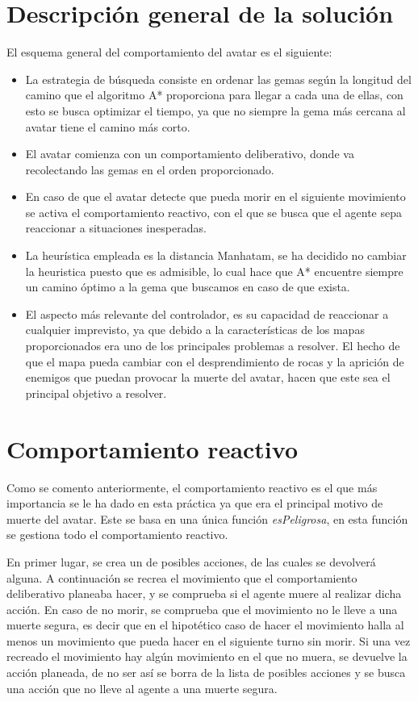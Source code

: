 \documentclass[size=a4, parskip=half, titlepage=false, toc=flat, toc=bib, 12pt]{scrartcl}
\begin{document}
\section{Descripción general de la solución}
El esquema general del comportamiento del avatar es el siguiente:
\begin{itemize}
\item La estrategia de búsqueda consiste en ordenar las gemas según la longitud del camino que el algoritmo A*
proporciona para llegar a cada una de ellas, con esto se busca optimizar el
tiempo, ya que no siempre la gema más cercana al avatar tiene el camino más corto.

\item El avatar comienza con un comportamiento deliberativo, donde va recolectando
las gemas en el orden proporcionado.

\item En caso de que el avatar detecte que pueda morir en el siguiente movimiento
se activa el comportamiento reactivo, con el que se busca que el agente
sepa reaccionar a situaciones inesperadas.

\item La heurística empleada es la distancia Manhatam, se ha decidido no cambiar
la heuristica puesto que es admisible, lo cual hace que A*
 encuentre siempre un camino óptimo a la gema que buscamos en caso de que exista.

\item El aspecto más relevante del controlador, es su capacidad de reaccionar
a cualquier imprevisto, ya que debido a la características de los mapas
proporcionados era uno de los principales problemas a resolver. El hecho de que
el mapa pueda cambiar con el desprendimiento de rocas y la aprición de enemigos
que puedan provocar la muerte del avatar, hacen que este sea el principal objetivo
a resolver.
\end{itemize}

\newpage

\section{Comportamiento reactivo}
Como se comento anteriormente, el comportamiento reactivo es el que más importancia
se le ha dado en esta práctica ya que era el principal motivo de muerte del avatar.
Este se basa en una única función \textit{esPeligrosa}, en esta función se gestiona
todo el comportamiento reactivo.

En primer lugar, se crea un  de posibles acciones, de las cuales
se devolverá alguna. A continuación se recrea el movimiento que el comportamiento
deliberativo planeaba hacer, y se comprueba si el agente muere al realizar dicha acción.
En caso de no morir, se comprueba que el movimiento no le lleve a una muerte segura,
es decir que en el hipotético caso de hacer el movimiento halla al menos un movimiento que
pueda hacer en el siguiente turno sin morir. Si una vez recreado el movimiento hay algún
movimiento en el que no muera, se devuelve la acción planeada, de no ser así se borra de
la lista de posibles acciones y se busca una acción que no lleve al agente a una muerte segura.
\end{document}
